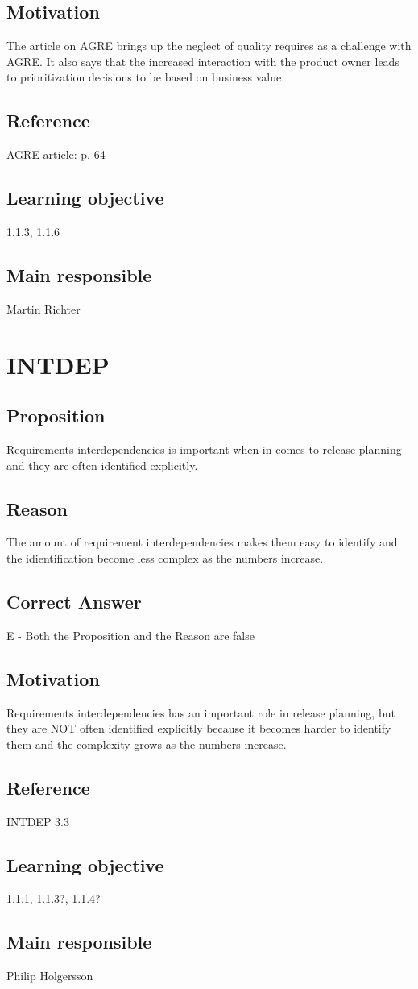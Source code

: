 \documentclass[a4paper]{article}
\begin{document}
\subsection*{Motivation}
The article on AGRE brings up the neglect of quality requires as a challenge with AGRE. It also says that the increased interaction with the product owner leads to prioritization decisions to be based on business value.
\subsection*{Reference}
AGRE article: p. 64
\subsection*{Learning objective}
1.1.3, 1.1.6
\subsection*{Main responsible}
Martin Richter

\section{INTDEP}
\subsection*{Proposition}
Requirements interdependencies is important when in comes to release planning and they are often identified explicitly.
\subsection*{Reason}
The amount of requirement interdependencies makes them easy to identify and the idientification become less complex as the numbers increase.
\subsection*{Correct Answer}
E - Both the Proposition and the Reason are false
\subsection*{Motivation}
Requirements interdependencies has an important role in release planning, but they are NOT often identified explicitly because it becomes harder to identify them and the complexity grows as the numbers increase.
\subsection*{Reference}
INTDEP 3.3
\subsection*{Learning objective}
1.1.1, 1.1.3?, 1.1.4?
\subsection*{Main responsible}
Philip Holgersson
\end{document}
